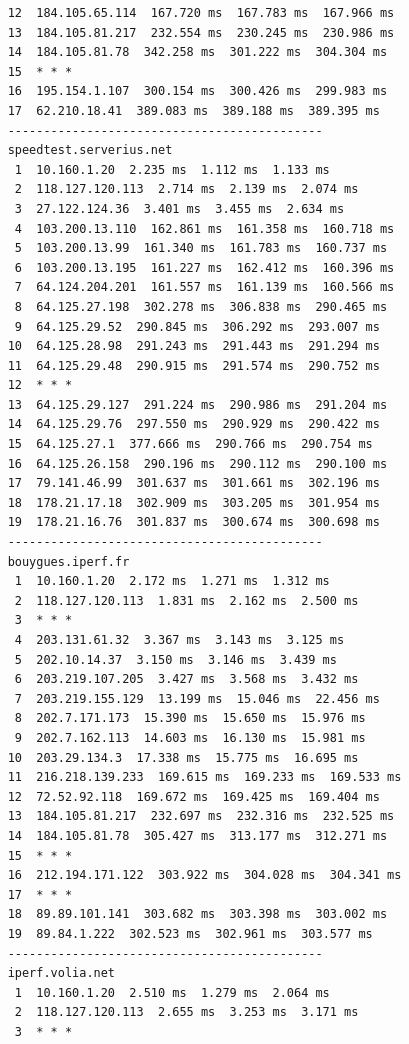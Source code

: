 \documentclass[paper=a4, fontsize=10pt]{scrartcl} %
\numberwithin{equation}{section} %
\numberwithin{figure}{section} %
\numberwithin{table}{section} %
\begin{document}
\begin{lstlisting}
    12  184.105.65.114  167.720 ms  167.783 ms  167.966 ms
    13  184.105.81.217  232.554 ms  230.245 ms  230.986 ms
    14  184.105.81.78  342.258 ms  301.222 ms  304.304 ms
    15  * * *
    16  195.154.1.107  300.154 ms  300.426 ms  299.983 ms
    17  62.210.18.41  389.083 ms  389.188 ms  389.395 ms
    --------------------------------------------
    speedtest.serverius.net
     1  10.160.1.20  2.235 ms  1.112 ms  1.133 ms
     2  118.127.120.113  2.714 ms  2.139 ms  2.074 ms
     3  27.122.124.36  3.401 ms  3.455 ms  2.634 ms
     4  103.200.13.110  162.861 ms  161.358 ms  160.718 ms
     5  103.200.13.99  161.340 ms  161.783 ms  160.737 ms
     6  103.200.13.195  161.227 ms  162.412 ms  160.396 ms
     7  64.124.204.201  161.557 ms  161.139 ms  160.566 ms
     8  64.125.27.198  302.278 ms  306.838 ms  290.465 ms
     9  64.125.29.52  290.845 ms  306.292 ms  293.007 ms
    10  64.125.28.98  291.243 ms  291.443 ms  291.294 ms
    11  64.125.29.48  290.915 ms  291.574 ms  290.752 ms
    12  * * *
    13  64.125.29.127  291.224 ms  290.986 ms  291.204 ms
    14  64.125.29.76  297.550 ms  290.929 ms  290.422 ms
    15  64.125.27.1  377.666 ms  290.766 ms  290.754 ms
    16  64.125.26.158  290.196 ms  290.112 ms  290.100 ms
    17  79.141.46.99  301.637 ms  301.661 ms  302.196 ms
    18  178.21.17.18  302.909 ms  303.205 ms  301.954 ms
    19  178.21.16.76  301.837 ms  300.674 ms  300.698 ms
    --------------------------------------------
    bouygues.iperf.fr
     1  10.160.1.20  2.172 ms  1.271 ms  1.312 ms
     2  118.127.120.113  1.831 ms  2.162 ms  2.500 ms
     3  * * *
     4  203.131.61.32  3.367 ms  3.143 ms  3.125 ms
     5  202.10.14.37  3.150 ms  3.146 ms  3.439 ms
     6  203.219.107.205  3.427 ms  3.568 ms  3.432 ms
     7  203.219.155.129  13.199 ms  15.046 ms  22.456 ms
     8  202.7.171.173  15.390 ms  15.650 ms  15.976 ms
     9  202.7.162.113  14.603 ms  16.130 ms  15.981 ms
    10  203.29.134.3  17.338 ms  15.775 ms  16.695 ms
    11  216.218.139.233  169.615 ms  169.233 ms  169.533 ms
    12  72.52.92.118  169.672 ms  169.425 ms  169.404 ms
    13  184.105.81.217  232.697 ms  232.316 ms  232.525 ms
    14  184.105.81.78  305.427 ms  313.177 ms  312.271 ms
    15  * * *
    16  212.194.171.122  303.922 ms  304.028 ms  304.341 ms
    17  * * *
    18  89.89.101.141  303.682 ms  303.398 ms  303.002 ms
    19  89.84.1.222  302.523 ms  302.961 ms  303.577 ms
    --------------------------------------------
    iperf.volia.net
     1  10.160.1.20  2.510 ms  1.279 ms  2.064 ms
     2  118.127.120.113  2.655 ms  3.253 ms  3.171 ms
     3  * * *

\end{lstlisting}
\end{document}
